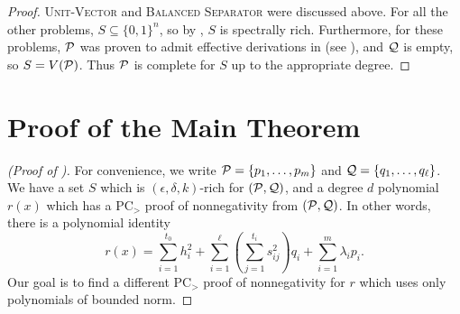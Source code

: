\begin{proof}
\textsc{Unit-Vector} and \textsc{Balanced Separator} were discussed above. For all the other problems, $S \subseteq \{0,1\}^n$, so by , $S$ is spectrally rich. Furthermore, for these problems, $\mathcal P$ was proven to admit effective derivations in  (see ), and $\mathcal Q$ is empty, so $S = V(\mathcal P)$. Thus $\mathcal P$ is complete for $S$ up to the appropriate degree. 
\end{proof}

\section{Proof of the Main Theorem}
\begin{proof}[(Proof of )]
For convenience, we write $\mathcal P = \{p_1,\dots,p_m\}$ and $\mathcal Q = \{q_1,\dots,q_\ell\}$. We have a set $S$ which is $(\epsilon,\delta,k)$-rich for $(\mathcal P,\mathcal Q)$, and a degree $d$ polynomial $r(x)$ which has a PC$_>$ proof of nonnegativity from $(\mathcal P,\mathcal Q)$. In other words, there is a polynomial identity
\[r(x) = \sum_{i=1}^{t_0} h_i^2 + \sum_{i=1}^\ell \left(\sum_{j=1}^{t_i} s_{ij}^2\right) q_i + \sum_{i=1}^m \lambda_i p_i.\]
Our goal is to find a different PC$_>$ proof of nonnegativity for $r$ which uses only polynomials of bounded norm.


\end{proof}
